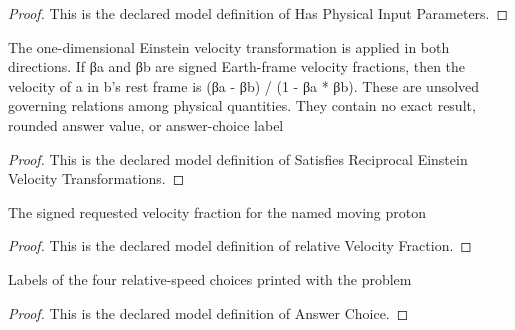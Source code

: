 \begin{proof}
  This is the declared model definition of Has Physical Input Parameters.
\end{proof}
\begin{definition}
  \label{def:physics:phyx-mini-0558:phyxminiproblems-problemphyxmini0558-satisfiesreciprocaleinsteinvelocitytransformations}
  The one-dimensional Einstein velocity transformation is applied in both directions. If βa and βb are signed Earth-frame velocity fractions, then the velocity of a in b's rest frame is (βa - βb) / (1 - βa * βb). These are unsolved governing relations among physical quantities. They contain no exact result, rounded answer value, or answer-choice label
\end{definition}
\begin{proof}
  This is the declared model definition of Satisfies Reciprocal Einstein Velocity Transformations.
\end{proof}
\begin{definition}
  \label{def:physics:phyx-mini-0558:phyxminiproblems-problemphyxmini0558-relativevelocityfraction}
  The signed requested velocity fraction for the named moving proton
\end{definition}
\begin{proof}
  This is the declared model definition of relative Velocity Fraction.
\end{proof}
\begin{definition}
  \label{def:physics:phyx-mini-0558:phyxminiproblems-problemphyxmini0558-answerchoice}
  Labels of the four relative-speed choices printed with the problem
\end{definition}
\begin{proof}
  This is the declared model definition of Answer Choice.
\end{proof}

